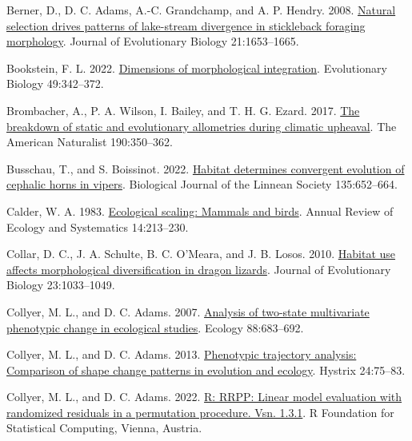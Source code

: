 \documentclass[
  11pt,
]{article}
\newlength{\cslhangindent}
\newlength{\cslentryspacingunit} %
\newenvironment{CSLReferences}[2] %
 {%
  \setlength{\parindent}{0pt}
  \ifodd #1
  \let\oldpar\par
  \def\par{\hangindent=\cslhangindent\oldpar}
  \fi
  \setlength{\parskip}{#2\cslentryspacingunit}
 }%
 {}
\begin{document}
\begin{CSLReferences}{1}{0}
\leavevmode{}%
Berner, D., D. C. Adams, A.-C. Grandchamp, and A. P. Hendry. 2008.
\href{https://doi.org/10.1111/j.1420-9101.2008.01583.x}{Natural
selection drives patterns of lake-stream divergence in stickleback
foraging morphology}. Journal of Evolutionary Biology 21:1653--1665.

\leavevmode{}%
Bookstein, F. L. 2022.
\href{https://doi.org/10.1007/s11692-022-09574-0}{Dimensions of
morphological integration}. Evolutionary Biology 49:342--372.

\leavevmode{}%
Brombacher, A., P. A. Wilson, I. Bailey, and T. H. G. Ezard. 2017.
\href{https://doi.org/10.1086/692570}{The breakdown of static and
evolutionary allometries during climatic upheaval}. The American
Naturalist 190:350--362.

\leavevmode{}%
Busschau, T., and S. Boissinot. 2022.
\href{https://doi.org/10.1093/biolinnean/blac008}{{Habitat determines
convergent evolution of cephalic horns in vipers}}. Biological Journal
of the Linnean Society 135:652--664.

\leavevmode{}%
Calder, W. A. 1983.
\href{https://doi.org/10.1146/annurev.es.14.110183.001241}{Ecological
scaling: Mammals and birds}. Annual Review of Ecology and Systematics
14:213--230.

\leavevmode{}%
Collar, D. C., J. A. Schulte, B. C. O'Meara, and J. B. Losos. 2010.
\href{https://doi.org/10.1111/j.1420-9101.2010.01971.x}{Habitat use
affects morphological diversification in dragon lizards}. Journal of
Evolutionary Biology 23:1033--1049.

\leavevmode{}%
Collyer, M. L., and D. C. Adams. 2007.
\href{https://doi.org/10.1890/06-0727}{Analysis of two-state
multivariate phenotypic change in ecological studies}. Ecology
88:683--692.

\leavevmode{}%
Collyer, M. L., and D. C. Adams. 2013.
\href{https://doi.org/10.4404/hystrix-24.1-6298}{Phenotypic trajectory
analysis: Comparison of shape change patterns in evolution and ecology}.
Hystrix 24:75--83.

\leavevmode{}%
Collyer, M. L., and D. C. Adams. 2022.
\href{https://CRAN.R-project.org/package=RRPP}{R: RRPP: Linear model
evaluation with randomized residuals in a permutation procedure. Vsn.
1.3.1}. R Foundation for Statistical Computing, Vienna, Austria.


\end{CSLReferences}
\end{document}
